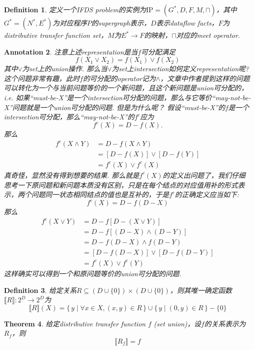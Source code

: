 \documentclass{article}
\newtheorem{theorem}{Theorem}[section]
\newtheorem{definition}[theorem]{Definition}
\newtheorem{annotation}[theorem]{Annotation}
\newcommand*{\xfunc}[4]{{#2}\colon{#3}{#1}{#4}}
\newcommand*{\func}[3]{\xfunc{\to}{#1}{#2}{#3}}
\newcommand\Set[2]{\{\,#1\mid#2\,\}} %
\begin{document}
\begin{definition}
\rm 定义一个IFDS problem的实例为$\text{IP}=(G^*,D,F,M,\sqcap)$，其中$G^*=(N^*,E^*)$为对应程序$P$的supergraph表示，$D$表示dataflow facts，$F$为distributive transfer function set，$M$为$E^* \to F$的映射，$\sqcap$对应的meet operator. 
\end{definition}

\begin{annotation}
\rm 注意上述representation是当$f$可分配满足
$$
f(X_1 \vee X_2) = f(X_1) \vee f(X_2)
$$
其中$\vee$为set上的union操作. 那么当$\vee$为set上intersection如何定义representation呢? 这个问题非常有趣，此时$f$的可分配的operator记为$\wedge$，文章中作者提到这样的问题可以转化为一个与当前问题等价的一个新问题，且这个新问题是union可分配的，i.e. 如果“must-be-X”是一个intersection可分配的问题，那么与它等价“may-not-be-X”问题就是一个union可分配的问题. 但是为什么呢？ 假设“must-be-X”的$f$是一个intersection可分配，那么“may-not-be-X”的$f^c$应为
$$
f^c(X) = D - f(X). 
$$
那么
$$
\begin{aligned}
f^c(X \wedge Y) &= D-f(X \wedge Y)\\ 
&= [D-f(X)] \vee [D-f(Y)] \\
&= f^c(X) \vee f^c(X)
\end{aligned}
$$
真奇怪，显然没有得到想要的结果. 那么就是$f^c(X)$的定义出问题了，我们仔细思考一下原问题和新问题本质没有区别，只是在每个结点的对应值用补的形式表示，两个问题同一状态相同结点的值也是互补的，于是$f^c$的正确定义应当如下:
$$
f^c(X)= D - f(D-X)
$$
那么
$$
\begin{aligned}
f^c(X \vee Y) &= D-f[D-(X \vee Y)] \\ 
&= D-f[(D-X) \wedge (D-Y)] \\
&= D-f(D-X) \wedge f(D-Y) \\
&= [D-f(D-X)] \vee [D-f(D-Y)] \\
&= f^c(X) \vee f^c(Y) 
\end{aligned}
$$
这样确实可以得到一个和原问题等价的union可分配的问题. 
\end{annotation}


\begin{definition}
\rm 给定关系$R \subseteq (D \cup \{0\}) \times (D \cup \{0\})$，则其唯一确定函数$\func{\llbracket R \rrbracket}{2^D}{2^D}$为
$$
\llbracket R \rrbracket(X) = \Set{y}{\forall x \in X, (x,y) \in R} \cup \Set{y}{(0,y) \in R } - \{0\}
$$
\end{definition}

\begin{theorem}\label{representation correctness}
\rm 给定distributive transfer function $f$ (set union)，设$f$的关系表示为$R_f$，则
$$
\llbracket R_f \rrbracket = f
$$
\end{theorem}
\end{document}
